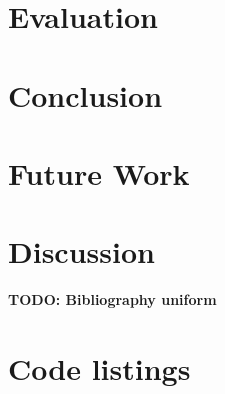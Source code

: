 \documentclass[12pt,a4paper,onecolumn,oneside,parskip]{memoir}
\newcommand{\todo}[1]{\textbf{TODO: #1}}
\begin{document}
%
%
%
%
%
%
%
%





\chapter{Evaluation}
\label{chapter:evaluation}

\chapter{Conclusion}

\chapter{Future Work}

\chapter{Discussion}
\label{chapter:discussion}

\todo{Bibliography uniform}




\appendix

\chapter{Code listings}

\end{document}
